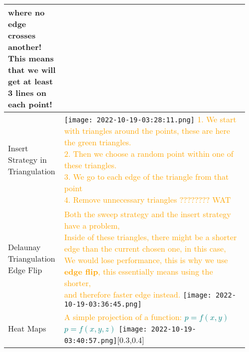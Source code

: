\documentclass[main.tex,fontsize=8pt,paper=a4,paper=portrait,DIV=calc,]{scrartcl}
\begin{document}
\begin{table}[ht!]
\begin{tabular}{|m{0.2\linewidth}|m{0.755\linewidth}|}
{\textbf{where no edge crosses another!}\newline
This means that we will get at least 3 lines on each point!}\\
\hline
Insert Strategy \newline in Triangulation & 
\vspace{2mm}
\texttt{[image: 2022-10-19-03:28:11.png]}\newline
\textcolor{orange}{1. We start with triangles around the points, these are here the green triangles.\newline
2. Then we choose a random point within one of these triangles.\newline
3. We go to each edge of the triangle from that point\newline
4. Remove unnecessary triangles ???????? WAT}\\
\hline
Delaunay Triangulation \newline Edge Flip &
\textcolor{orange}{Both the sweep strategy and the insert strategy have a problem, \newline
Inside of these triangles, there might be a shorter edge than the current chosen one, in this case, \newline
We would lose performance, this is why we use \textbf{edge flip}, this essentially means using the shorter,\newline
and therefore faster edge instead.}\newline
\texttt{[image: 2022-10-19-03:36:45.png]}\\
\hline
Heat Maps & \minipg{
\textcolor{orange}{A simple projection of a function: }\newline
\huge \textcolor{teal}{\( p = f(x,y) \)}\newline
\huge \textcolor{teal}{\( p = f(x,y,z) \)}
\normalsize
}{
\texttt{[image: 2022-10-19-03:40:57.png]}}[0.3,0.4]\\ 
\hline
\end{tabular}
\end{table}
\pagebreak
\end{document}

